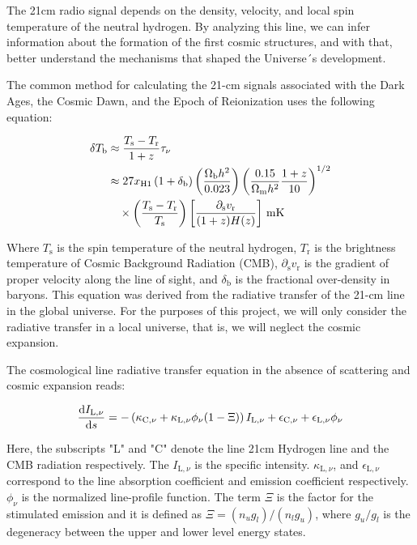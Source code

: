 \documentclass[apj]{emulateapj}
\begin{document}
The 21cm radio signal depends on the density, velocity, and local spin temperature of the neutral hydrogen. By analyzing this line, we can infer information about the formation of the first cosmic structures, and with that, better understand the mechanisms that shaped the Universe´s development.

The common method for calculating the 21-cm signals associated with the Dark Ages, the Cosmic Dawn, and the Epoch of Reionization uses the following equation:

\begin{equation}{\label{eq1}}
\begin{aligned}
\delta T_{\mathrm{b}} & \approx \frac{T_{\mathrm{s}} - T_{\mathrm{r}}}{1+z} \tau_\nu \\
& \approx 27 x_{\mathrm{H}1}\left(1 + \delta_{\mathrm{b}}\right)\left(\frac{\Omega_{\mathrm{b}} h^2}{0.023}\right) \left(\frac{0.15}{\Omega_{\mathrm{m}} h^2} \frac{1+z}{10}\right)^{1/2} \\
& \quad \times \left(\frac{T_{\mathrm{s}} - T_{\mathrm{r}}}{T_{\mathrm{s}}}\right)\left[\frac{\partial_{\mathrm{s}} v_{\mathrm{r}}}{(1+z) H(z)}\right] \, \mathrm{mK}
\end{aligned}
\end{equation}

Where $T_{\mathrm{s}}$ is the spin temperature of the neutral hydrogen, $T_{\mathrm{r}}$ is the brightness temperature of Cosmic Background Radiation (CMB), $\partial_{\mathrm{s}} v_{\mathrm{r}}$ is the gradient of proper velocity along the line of sight, and $\delta_{\mathrm{b}}$ is the fractional over-density in baryons. This equation was derived from the radiative transfer of the 21-cm line in the global universe. For the purposes of this project, we will only consider the radiative transfer in a local universe, that is, we will neglect the cosmic expansion.

The cosmological line radiative transfer equation in the absence of scattering and cosmic expansion reads:
\begin{center}
\begin{equation}{\label{eq2}}
\frac{\mathrm{d}I_{\mathrm{L}, \nu}}{\mathrm{d} s}= -\left(\kappa_{\mathrm{C}, \nu} + \kappa_{\mathrm{L}, \nu} \phi_\nu (1 - \Xi)\right) I_{\mathrm{L}, \nu} +\epsilon_{\mathrm{C},\nu}+\epsilon_{\mathrm{L}, \nu} \phi_\nu
\end{equation}
\end{center}

Here, the subscripts "L" and "C" denote the line 21cm Hydrogen line and the CMB radiation respectively. The $I_{\mathrm{L}, \nu}$ is the specific intensity. $\kappa_{\mathrm{L}, \nu}$, and $\epsilon_{\mathrm{L}, \nu}$ correspond to the line absorption coefficient and emission coefficient respectively. $\phi_\nu$ is the normalized line-profile function. The term $\Xi$ is the factor for the stimulated emission and it is defined as $\Xi = (n_{u}g_{l})/(n_{l}g_{u})$, where $g_{u}/g_{l}$ is the degeneracy between the upper and lower level energy states.
\end{document}
